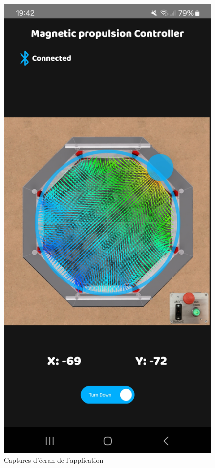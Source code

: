 \documentclass{article}
\begin{document}
\begin{figure}[H]
\begin{minipage}{0.3\textwidth}
    \end{minipage}\hfill
    \begin{minipage}{0.3\textwidth}
        \centering
        \includegraphics[width=\linewidth]{Images/app1 (2).jpg}

    \end{minipage}\hfill
    \caption{Captures d'écran de l'application}
\end{figure}
        
\end{document}
